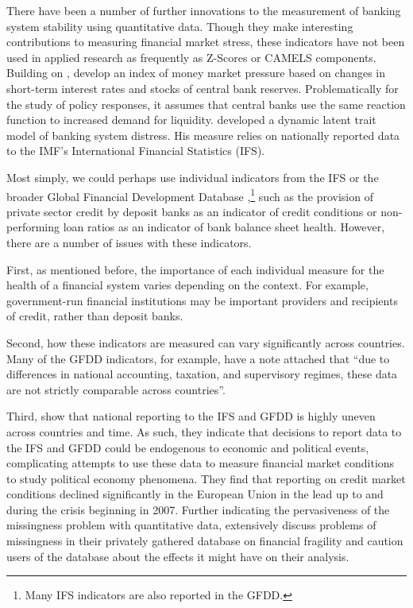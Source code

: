 \documentclass[]{article}
\begin{document}
There have been a number of further innovations to the measurement of banking system stability using quantitative data. Though they make interesting contributions to measuring financial market stress, these indicators have not been used in applied research as frequently as Z-Scores or CAMELS components. Building on \cite{vonHagen2007}, \cite{Jing2015} develop an index of money market pressure based on changes in short-term interest rates and stocks of central bank reserves. Problematically for the study of policy responses, it assumes that central banks use the same reaction function to increased demand for liquidity. \cite{Rosas2009dltm} developed a dynamic latent trait model of banking system distress. His measure relies on nationally reported data to the IMF's International Financial Statistics (IFS).

Most simply, we could perhaps use individual indicators from the IFS or the broader Global Financial Development Database \citep[GFDD,][]{worldbank2015},\footnote{Many IFS indicators are also reported in the GFDD.} such as the provision of private sector credit by deposit banks as an indicator of credit conditions or non-performing loan ratios as an indicator of bank balance sheet health. However, there are a number of issues with these indicators.

First, as mentioned before, the importance of each individual measure for the health of a financial system varies depending on the context. For example, government-run financial institutions may be important providers and recipients of credit, rather than deposit banks.

Second, how these indicators are measured can vary significantly across countries. Many of the GFDD indicators, for example, have a note attached that ``due to differences in national accounting, taxation, and supervisory regimes, these data are not strictly comparable across countries''.

Third, \cite{cghBruegel2015} show that national reporting to the IFS and GFDD is highly uneven across countries and time. As such, they indicate that decisions to report data to the IFS and GFDD could be endogenous to economic and political events, complicating attempts to use these data to measure financial market conditions to study political economy phenomena. They find that reporting on credit market conditions declined significantly in the European Union in the lead up to and during the crisis beginning in 2007. Further indicating the pervasiveness of the missingness problem with quantitative data, \cite{Andrianova2015} extensively discuss problems of missingness in their privately gathered database on financial fragility and caution users of the database about the effects it might have on their analysis.
\end{document}
